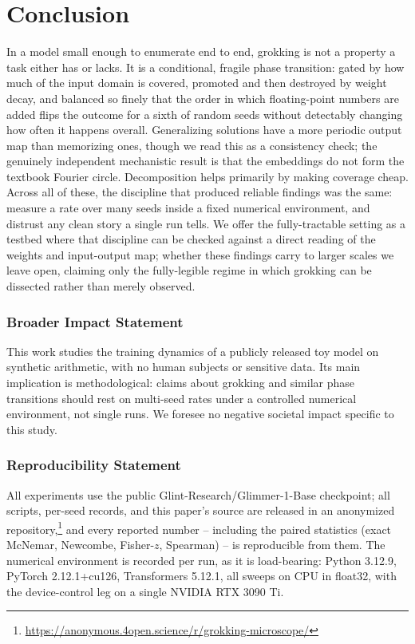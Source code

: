 \documentclass[10pt]{article} %
\begin{document}
\section{Conclusion}
\label{sec:conclusion}

In a model small enough to enumerate end to end, grokking is not a property a task either has or
lacks. It is a conditional, fragile phase transition: gated by how much of the input domain is
covered, promoted and then destroyed by weight decay, and balanced so finely that the order in
which floating-point numbers are added flips the outcome for a sixth of random seeds without
detectably changing how often it happens overall. Generalizing solutions have a more periodic
output map than memorizing ones, though we read this as a consistency check; the genuinely
independent mechanistic result is that the embeddings do not form the textbook Fourier circle.
Decomposition helps primarily by making coverage cheap. Across all of these, the discipline that
produced reliable findings was the same: measure a rate over many seeds inside a fixed numerical
environment, and distrust any clean story a single run tells. We offer the fully-tractable setting
as a testbed where that discipline can be checked against a direct reading of the weights and
input-output map; whether these findings carry to larger scales we leave open, claiming only the
fully-legible regime in which grokking can be dissected rather than merely observed.

\subsubsection*{Broader Impact Statement}
This work studies the training dynamics of a publicly released toy model on synthetic arithmetic,
with no human subjects or sensitive data. Its main implication is methodological: claims about
grokking and similar phase transitions should rest on multi-seed rates under a controlled numerical
environment, not single runs. We foresee no negative societal impact specific to this study.

\subsubsection*{Reproducibility Statement}
All experiments use the public Glint-Research/Glimmer-1-Base checkpoint; all scripts, per-seed
records, and this paper's source are released in an anonymized
repository,\footnote{\url{https://anonymous.4open.science/r/grokking-microscope/}} and every
reported number -- including the paired statistics (exact
McNemar, Newcombe, Fisher-$z$, Spearman) -- is reproducible from them. The numerical environment is
recorded per run, as it is load-bearing: Python 3.12.9, PyTorch 2.12.1+cu126, Transformers 5.12.1,
all sweeps on CPU in float32, with the device-control leg on a single NVIDIA RTX 3090 Ti.



\end{document}
